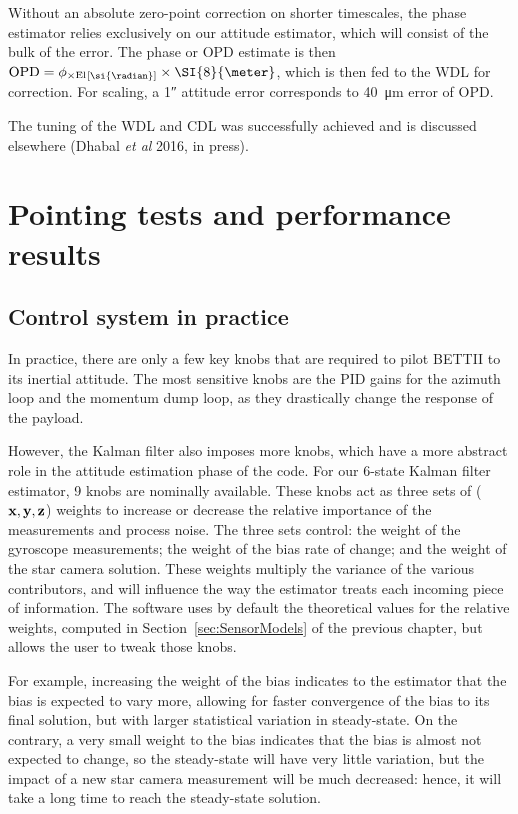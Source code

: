 Without an absolute zero-point correction on shorter timescales, the phase estimator relies exclusively on our attitude estimator, which will consist of the bulk of the error. The phase or OPD estimate is then $\OPD = \crossEl\units{\si{\radian}}\times \SI{8}{\meter} $, which is then fed to the WDL for correction. For scaling, a \ang{;;1} attitude error corresponds to \SI{40}{\um} error of OPD. 

The tuning of the WDL and CDL was successfully achieved and is discussed elsewhere (Dhabal \textit{et al} 2016, in press).



\section{Pointing tests and performance results}

\subsection{Control system in practice}

In practice, there are only a few key knobs that are required to pilot BETTII to its inertial attitude. The most sensitive knobs are the PID gains for the azimuth loop and the momentum dump loop, as they drastically change the response of the payload. 

However, the Kalman filter also imposes more knobs, which have a more abstract role in the attitude estimation phase of the code. For our 6-state Kalman filter estimator, 9 knobs are nominally available. These knobs act as three sets of ($\textrm{\textbf{x}}, \textrm{\textbf{y}}, \textrm{\textbf{z}}$) weights to increase or decrease the relative importance of the measurements and process noise. The three sets control: the weight of the gyroscope measurements; the weight of the bias rate of change; and the weight of the star camera solution. These weights multiply the variance of the various contributors, and will influence the way the estimator treats each incoming piece of information. The software uses by default the theoretical values for the relative weights, computed in Section~\ref{sec:SensorModels} of the previous chapter, but allows the user to tweak those knobs. 

For example, increasing the weight of the bias indicates to the estimator that the bias is expected to vary more, allowing for faster convergence of the bias to its final solution, but with larger statistical variation in steady-state. On the contrary, a very small weight to the bias indicates that the bias is almost not expected to change, so the steady-state will have very little variation, but the impact of a new star camera measurement will be much decreased: hence, it will take a long time to reach the steady-state solution.

